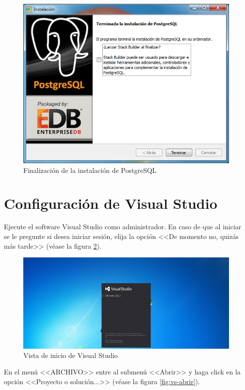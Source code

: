 \begin{figure}[H]
  \centering
  \includegraphics[width=.8\linewidth]{./img/postgres9.jpg}
\caption[]{Finalizaci\'{o}n de la instalaci\'{o}n de PostgreSQL\label{fig:vs-instalacion9}}
\end{figure}

\newpage

\section*{Configuraci\'{o}n de Visual Studio}
	
	Ejecute el software Visual Studio como administrador. En caso de que al iniciar se le pregunte si desea iniciar sesi\'{o}n, elija la opci\'{o}n <<De momento no, quiz\'{a}s m\'{a}s tarde>> (v\'{e}ase la figura \ref{fig:vs-inicio}).	

\begin{figure}[H]
  \centering
  \includegraphics[width=.8\linewidth]{./img/vs-inicio.jpg}
\caption[]{Vista de inicio de Visual Studio\label{fig:vs-inicio}}
\end{figure}

En el men\'{u} <<ARCHIVO>> entre al submen\'{u} <<Abrir>> y haga click en la opci\'{o}n <<Proyecto o soluci\'{o}n...>> (v\'{e}ase la figura \ref{fig:vs-abrir}).	

